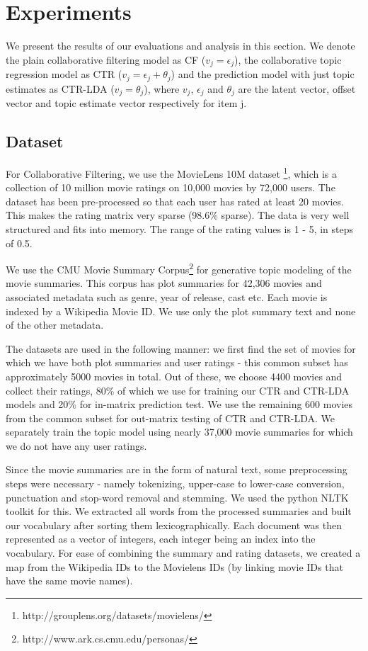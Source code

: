 \documentclass{article} %
\begin{document}
\section{Experiments}

We present the results of our evaluations and analysis in this section. We
denote the plain collaborative filtering model as CF ($v_{j}=\epsilon_{j}$), the
collaborative topic regression model as CTR ($v_{j}=\epsilon_{j}+\theta_{j}$) 
and the prediction model with just topic estimates as CTR-LDA 
($v_{j}=\theta_{j}$), where $v_{j}$, $\epsilon_{j}$ and $\theta_{j}$ are the 
latent vector, offset vector and topic estimate vector respectively for item j.

\subsection{Dataset}

For Collaborative Filtering, we use the MovieLens 10M dataset
\footnote{http://grouplens.org/datasets/movielens/}, which is a collection of 
10 million movie ratings on 10,000 movies by 72,000 users. The dataset has been 
pre-processed so that each user has rated at least 20 movies. This makes the 
rating matrix very sparse (98.6\% sparse). The data is very well structured 
and fits into memory. The range of the rating values is 1 - 5, in steps of 0.5.

We use the CMU Movie Summary Corpus\footnote{http://www.ark.cs.cmu.edu/personas/} for generative topic modeling of the movie summaries. This
corpus has plot summaries for 42,306 movies and associated metadata such as 
genre, year of release, cast etc. Each movie is indexed by a Wikipedia Movie ID.
We use only the plot summary text and none of the other metadata. 

The datasets are used in the following manner: we first find the set of movies 
for which we have both plot summaries and user ratings - this common subset has
approximately 5000 movies in total. Out of these, we choose 4400 movies and 
collect their ratings, 80\% of which we use for training our CTR and CTR-LDA 
models and 20\% for in-matrix prediction test. We use the remaining 600 movies
from the common subset for out-matrix testing of CTR and CTR-LDA. We 
separately train the topic model using nearly 37,000 movie summaries for
which we do not have any user ratings. 

Since the movie summaries are in the form of natural text, some preprocessing
steps were necessary - namely tokenizing, upper-case to lower-case conversion,
punctuation and stop-word removal and stemming. We used the python NLTK toolkit 
\cite{nltk} for this. We extracted all words from the processed summaries and 
built our vocabulary after sorting them lexicographically. Each document was 
then represented as a vector of integers, each integer being an index into the 
vocabulary. For ease of combining the summary and rating datasets, we 
created a map from the Wikipedia IDs to the Movielens IDs (by linking movie IDs 
that have the same movie names). 
\end{document}
